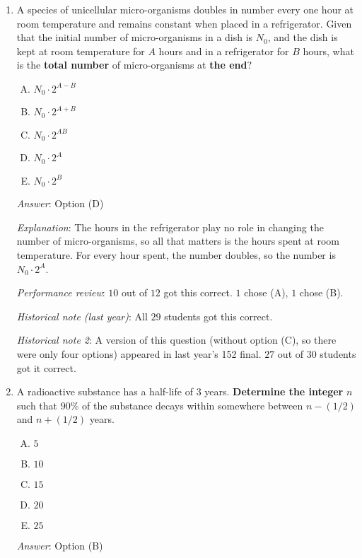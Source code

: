 \documentclass[10pt]{amsart}
\begin{document}
\begin{enumerate}
\item A species of unicellular micro-organisms doubles in number every
  one hour at room temperature and remains constant when placed in a
  refrigerator. Given that the initial number of micro-organisms in a
  dish is $N_0$, and the dish is kept at room temperature for $A$ hours
  and in a refrigerator for $B$ hours, what is the {\bf total number} of
  micro-organisms at {\bf the end}? 

  \begin{enumerate}[(A)]
  \item $N_0 \cdot 2^{A - B}$
  \item $N_0 \cdot 2^{A + B}$
  \item $N_0 \cdot 2^{AB}$
  \item $N_0 \cdot 2^A$
  \item $N_0 \cdot 2^B$
  \end{enumerate}

  {\em Answer}: Option (D)

  {\em Explanation}: The hours in the refrigerator play no role in
  changing the number of micro-organisms, so all that matters is the
  hours spent at room temperature. For every hour spent, the number
  doubles, so the number is $N_0 \cdot 2^A$.

  {\em Performance review}: $10$ out of $12$ got this correct. $1$
  chose (A), $1$ chose (B).

  {\em Historical note (last year)}: All $29$ students got this correct.

  {\em Historical note 2}: A version of this question (without option
  (C), so there were only four options) appeared in last year's 152
  final. $27$ out of $30$ students got it correct.


\item A radioactive substance has a half-life of $3$ years. {\bf
  Determine the integer} $n$ such that $90\%$ of the substance decays
  within somewhere between $n - (1/2)$ and $n + (1/2)$ years.

  \begin{enumerate}[(A)]
  \item $5$
  \item $10$
  \item $15$
  \item $20$
  \item $25$
  \end{enumerate}

  {\em Answer}: Option (B)


\end{enumerate}
\end{document}
